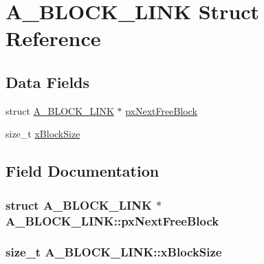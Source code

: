 \hypertarget{structA__BLOCK__LINK}{\section{A\-\_\-\-B\-L\-O\-C\-K\-\_\-\-L\-I\-N\-K Struct Reference}
\label{structA__BLOCK__LINK}
}
\subsection*{Data Fields}
\begin{DoxyCompactItemize}
\item 
struct \hyperlink{structA__BLOCK__LINK}{A\-\_\-\-B\-L\-O\-C\-K\-\_\-\-L\-I\-N\-K} $\ast$ \hyperlink{structA__BLOCK__LINK_aaef1b26e95b0b7b7ebffc91fa6ce874f}{px\-Next\-Free\-Block}
\item 
size\-\_\-t \hyperlink{structA__BLOCK__LINK_ad5dcf5df03d8be6186c567be9e2c657b}{x\-Block\-Size}
\end{DoxyCompactItemize}


\subsection{Field Documentation}
\hypertarget{structA__BLOCK__LINK_aaef1b26e95b0b7b7ebffc91fa6ce874f}{
\subsubsection[{px\-Next\-Free\-Block}]{\setlength{\rightskip}{0pt plus 5cm}struct {\bf A\-\_\-\-B\-L\-O\-C\-K\-\_\-\-L\-I\-N\-K} $\ast$ A\-\_\-\-B\-L\-O\-C\-K\-\_\-\-L\-I\-N\-K\-::px\-Next\-Free\-Block}}\label{structA__BLOCK__LINK_aaef1b26e95b0b7b7ebffc91fa6ce874f}
\hypertarget{structA__BLOCK__LINK_ad5dcf5df03d8be6186c567be9e2c657b}{
\subsubsection[{x\-Block\-Size}]{\setlength{\rightskip}{0pt plus 5cm}size\-\_\-t A\-\_\-\-B\-L\-O\-C\-K\-\_\-\-L\-I\-N\-K\-::x\-Block\-Size}}\label{structA__BLOCK__LINK_ad5dcf5df03d8be6186c567be9e2c657b}


